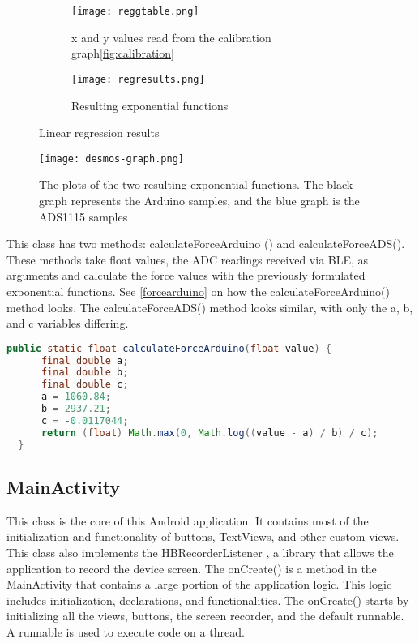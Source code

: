 \begin{figure}[h]
  \centering
  \begin{subfigure}{0.4\textwidth}
  \texttt{[image: reggtable.png]} 
  \caption{x and y values read from the calibration graph\ref{fig:calibration}}
  \label{fig:subim1}
  \end{subfigure}
  \begin{subfigure}{0.4\textwidth}
  \texttt{[image: regresults.png]}
  \caption{Resulting exponential functions }
  \label{fig:subim2}
  \end{subfigure}
  
  \caption{Linear regression results}
  \label{fig:image2}
  \end{figure}
  \begin{figure}[!htb]
    \centering
    \texttt{[image: desmos-graph.png]}
    \caption{The plots of the two resulting exponential functions. The black graph represents the Arduino samples, and the blue graph is the ADS1115 samples}
    \label{fig:desmosgraph}
  \end{figure}
\clearpage
  This class has two methods: calculateForceArduino () and calculateForceADS(). These methods take float values, the ADC readings received via BLE, as arguments and calculate the force values with the previously formulated exponential functions. See  \ref{forcearduino} on how the calculateForceArduino() method looks. The calculateForceADS() method looks similar, with only the a, b, and c variables differing. 

  \begin{lstlisting}[language=java,caption=Method that calculates the force of the ADC readings from the Arduino, label=forcearduino]
    public static float calculateForceArduino(float value) {
      final double a;
      final double b;
      final double c;
      a = 1060.84;
      b = 2937.21;
      c = -0.0117044;
      return (float) Math.max(0, Math.log((value - a) / b) / c);
  }
  \end{lstlisting}
\clearpage
  \subsection{MainActivity}

  This class is the core of this Android application. It contains most of the initialization and functionality of buttons, TextViews, and other custom views. This class also implements the HBRecorderListener \cite{jakubferenciktadfrysinger2022}, a library that allows the application to record the device screen. The onCreate()  is a method in the MainActivity that contains a large portion of the application logic. This logic includes initialization, declarations, and functionalities. The onCreate() starts by initializing all the views, buttons, the screen recorder, and the default runnable. A runnable is used to execute code on a thread.

